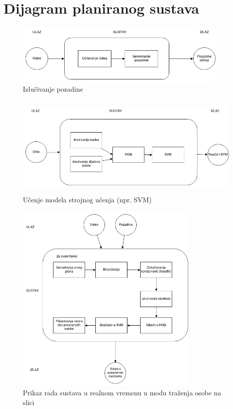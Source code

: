\documentclass[times, utf8, seminar, numeric]{fer}
\begin{document}
\chapter{Dijagram planiranog sustava}

\begin{figure}[htb]
\centering
\includegraphics[height=3cm]{Dijagram1.png}
\caption{Izlučivanje pozadine}
\label{fig:sintaksno_stablo}
\end{figure}

\begin{figure}[htb]
\centering
\includegraphics[height=5cm]{Dijagram3.png}
\caption{Učenje modela strojnog učenja (npr. SVM)}
\label{fig:ucenje}
\end{figure}


\begin{figure}[htb]
\centering
\includegraphics[width=9cm]{Dijagram2.png}
\caption{Prikaz rada sustava u realnom vremenu u modu traženja osobe na slici}
\label{fig:sustav}
\end{figure}
\end{document}
